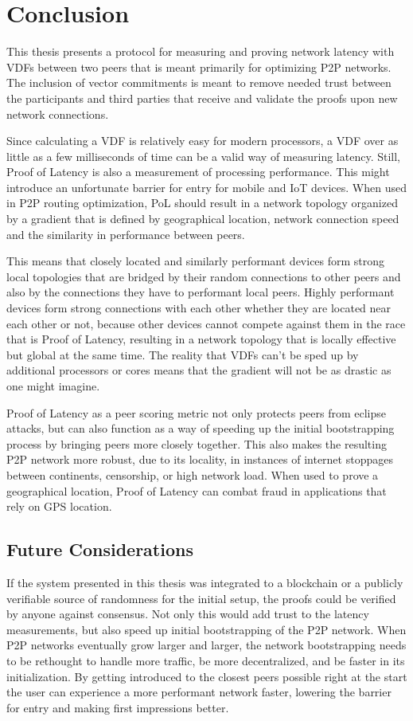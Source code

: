 \chapter{Conclusion}
\label{Conclusion}
This thesis presents a protocol for measuring and proving network latency with VDFs between two peers that is meant primarily for optimizing P2P networks. The inclusion of vector commitments is meant to remove needed trust between the participants and third parties that receive and validate the proofs upon new network connections.

Since calculating a VDF is relatively easy for modern processors, a VDF over as little as a few milliseconds of time can be a valid way of measuring latency. Still, Proof of Latency is also a measurement of processing performance. This might introduce an unfortunate barrier for entry for mobile and IoT devices. When used in P2P routing optimization, PoL should result in a network topology organized by a gradient that is defined by geographical location, network connection speed and the similarity in performance between peers.

This means that closely located and similarly performant devices form strong local topologies that are bridged by their random connections to other peers and also by the connections they have to performant local peers. Highly performant devices form strong connections with each other whether they are located near each other or not, because other devices cannot compete against them in the race that is Proof of Latency, resulting in a network topology that is locally effective but global at the same time. The reality that VDFs can't be sped up by additional processors or cores means that the gradient will not be as drastic as one might imagine.

Proof of Latency as a peer scoring metric not only protects peers from eclipse attacks, but can also function as a way of speeding up the initial bootstrapping process by bringing peers more closely together. This also makes the resulting P2P network more robust, due to its locality, in instances of internet stoppages between continents, censorship, or high network load. When used to prove a geographical location, Proof of Latency can combat fraud in applications that rely on GPS location.

\section{Future Considerations}
If the system presented in this thesis was integrated to a blockchain or a publicly verifiable source of randomness for the initial setup, the proofs could be verified by anyone against consensus. Not only this would add trust to the latency measurements, but also speed up initial bootstrapping of the P2P network. When P2P networks eventually grow larger and larger, the network bootstrapping needs to be rethought to handle more traffic, be more decentralized, and be faster in its initialization. By getting introduced to the closest peers possible right at the start the user can experience a more performant network faster, lowering the barrier for entry and making first impressions better.


